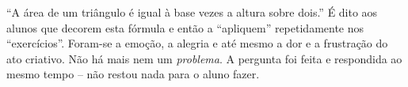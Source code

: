 \documentclass[a4paper,oneside,12pt,notitlepage]{article}
\begin{document}
\vspace{1em}

``A área de um triângulo é igual à base vezes a altura sobre dois.''
É dito aos alunos que decorem esta fórmula e então a ``apliquem'' repetidamente nos ``exercícios''.
Foram-se a emoção, a alegria e até mesmo a dor e a frustração do ato criativo.
Não há mais nem um \textsl{problema}.
A pergunta foi feita e respondida ao mesmo tempo -- não restou nada para o aluno fazer.

\end{document}
